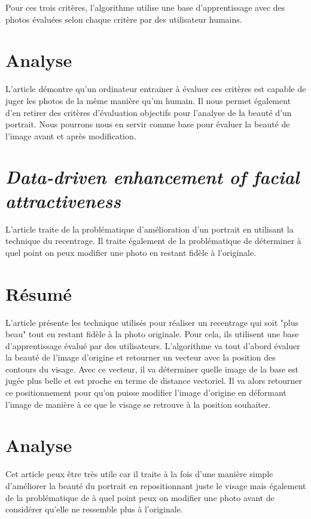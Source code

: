 \documentclass[11pt, french]{report-rd-info}
\begin{document}
Pour ces trois critères, l'algorithme utilise une base d'apprentissage avec des photos évaluées selon chaque critère par des utilisateur humains.

\section{Analyse}
L'article démontre qu'un ordinateur entrainer à évaluer ces critères est capable de juger les photos de la même manière qu'un humain.
Il nous permet également d'en retirer des critères d'évaluation objectifs pour l'analyse de la beauté d'un portrait.
Nous pourrons nous en servir comme base pour évaluer la beauté de l'image avant et après modification.

\section{\emph{Data-driven enhancement of facial attractiveness}}
L'article \cite{Leyvand2008} traite de la problématique d'amélioration d'un portrait en utilisant la technique du recentrage. Il traite également de la problématique de déterminer à quel point on peux modifier une photo en restant fidèle à l'originale.

\section{Résumé}
L'article présente les technique utilisés pour réaliser un recentrage qui soit "plus beau" tout en restant fidèle à la photo originale. Pour cela, ils utilisent une base d'apprentissage évalué par des utilisateurs.
L'algorithme va tout d'abord évaluer la beauté de l'image d'origine et retourner un vecteur avec la position des contours du visage. Avec ce vecteur, il va déterminer quelle image de la base est jugée plus belle et est proche en terme de distance vectoriel. Il va alors retourner ce positionnement pour qu'on puisse modifier l'image d'origine en déformant l'image de manière à ce que le visage se retrouve à la position souhaiter. 

\section{Analyse}
Cet article peux être très utile car il traite à la fois d'une manière simple d'améliorer la beauté du portrait en repositionnant juste le visage mais également de la problématique de à quel point peux on modifier une photo avant de considérer qu'elle ne ressemble plus à l'originale.
\end{document}
